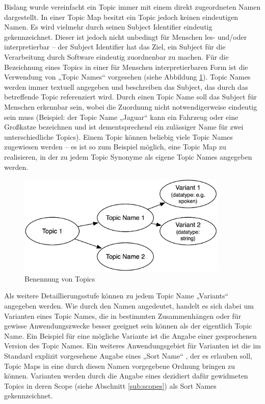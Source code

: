 Bislang wurde vereinfacht ein Topic immer mit einem direkt zugeordneten Namen dargestellt. In einer Topic Map besitzt ein Topic jedoch keinen eindeutigen Namen. Es wird vielmehr durch seinen Subject Identifier eindeutig gekennzeichnet. Dieser ist jedoch nicht unbedingt für Menschen les- und/oder interpretierbar -- der Subject Identifier hat das Ziel, ein Subject für die Verarbeitung durch Software eindeutig zuordnenbar zu machen. Für die Bezeichnung eines Topics in einer für Menschen interpretierbaren Form ist die Verwendung von „Topic Names“ vorgesehen (siehe Abbildung \ref{fig:img_Persistenz_TopicNaming}). Topic Names werden immer textuell angegeben und beschreiben das Subject, das durch das betreffende Topic referenziert wird. Durch einen Topic Name soll das Subject für Menschen erkennbar sein, wobei die Zuordnung nicht notwendigerweise eindeutig sein muss (Beispiel: der Topic Name „Jaguar“ kann ein Fahrzeug oder eine Großkatze bezeichnen und ist dementsprechend ein zulässiger Name für zwei unterschiedliche Topics). Einem Topic können beliebig viele Topic Names zugewiesen werden -- es ist so zum Beispiel möglich, eine Topic Map zu realisieren, in der zu jedem Topic Synonyme als eigene Topic Names angegeben werden. 

\begin{figure}[htbp]
	\centering
		\includegraphics[width=10cm]{img/Persistenz/TopicNaming.png}
	\caption{Benennung von Topics}
	\label{fig:img_Persistenz_TopicNaming}
\end{figure}

Als weitere Detaillierungsstufe können zu jedem Topic Name „Variants“ angegeben werden. Wie durch den Namen angedeutet, handelt es sich dabei um Varianten eines Topic Names, die in bestimmten Zusammenhängen oder für gewisse Anwendungszwecke besser geeignet sein können als der eigentlich Topic Name. Ein Beispiel für eine mögliche Variante ist die Angabe einer gesprochenen Version des Topic Names. Ein weiteres Anwendungsgebiet für Varianten ist die im Standard explizit vorgesehene Angabe eines „Sort Name“ \citep[][S. 18]{TMDM08}, der es erlauben soll, Topic Maps in eine durch diesen Namen vorgegebene Ordnung bringen zu können. Varianten werden durch die Angabe eines dezidiert dafür gewidmeten Topics in deren Scope (siehe Abschnitt \ref{sub:scopes}) als Sort Names gekennzeichnet.

